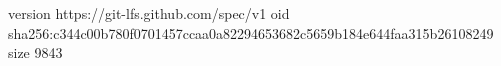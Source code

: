 version https://git-lfs.github.com/spec/v1
oid sha256:c344c00b780f0701457ccaa0a82294653682c5659b184e644faa315b26108249
size 9843
